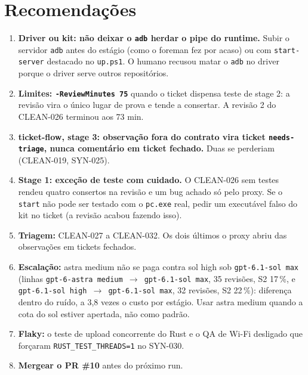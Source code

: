 \documentclass[11pt,a4paper]{article}
\begin{document}
\section{Recomendações}
\begin{enumerate}
  \item \textbf{Driver ou kit: não deixar o \texttt{adb} herdar o pipe do
        runtime.} Subir o servidor \texttt{adb} antes do estágio (como o
        foreman fez por acaso) ou com \texttt{start-server} destacado no
        \texttt{up.ps1}. O humano recusou matar o \texttt{adb} no driver
        porque o driver serve outros repositórios.
  \item \textbf{Limites: \texttt{-ReviewMinutes 75}} quando o ticket dispensa
        teste de stage 2: a revisão vira o único lugar de prova e tende a
        consertar. A revisão 2 do CLEAN-026 terminou aos 73 min.
  \item \textbf{ticket-flow, stage 3: observação fora do contrato vira ticket
        \texttt{needs-triage}, nunca comentário em ticket fechado.} Duas se
        perderiam (CLEAN-019, SYN-025).
  \item \textbf{Stage 1: exceção de teste com cuidado.} O CLEAN-026 sem testes
        rendeu quatro consertos na revisão e um bug achado só pelo proxy. Se o
        \texttt{start} não pode ser testado com o \texttt{pc.exe} real, pedir
        um executável falso do kit no ticket (a revisão acabou fazendo isso).
  \item \textbf{Triagem:} CLEAN-027 a CLEAN-032. Os dois últimos o proxy
        abriu das observações em tickets fechados.
  \item \textbf{Escalação:} astra medium não se paga contra sol high sob
        \texttt{gpt-6.1-sol max} (linhas \texttt{gpt-6-astra medium $\to$
        gpt-6.1-sol max}, 35 revisões, S2 17\,\%, e \texttt{gpt-6.1-sol high
        $\to$ gpt-6.1-sol max}, 32 revisões, S2 22\,\%): diferença dentro do
        ruído, a 3,8 vezes o custo por estágio. Usar astra medium quando a
        cota do sol estiver apertada, não como padrão.
  \item \textbf{Flaky:} o teste de upload concorrente do Rust e o QA de Wi-Fi
        desligado que forçaram \texttt{RUST\_TEST\_THREADS=1} no SYN-030.
  \item \textbf{Mergear o PR \#10} antes do próximo run.
\end{enumerate}
\end{document}

